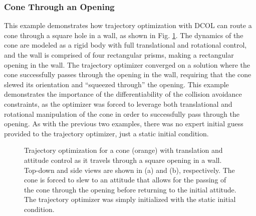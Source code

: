 \subsubsection{Cone Through an Opening}
This example demonstrates how trajectory optimization with DCOL can route a cone through a square hole in a wall, as shown in Fig. \ref{fig:conewall}. The dynamics of the cone are modeled as a rigid body with full translational and rotational control, and the wall is comprised of four rectangular prisms, making a rectangular opening in the wall. The trajectory optimizer converged on a solution where the cone successfully passes through the opening in the wall, requiring that the cone slewed its orientation and ``squeezed through'' the opening.  This example demonstrates the importance of the differentiability of the collision avoidance constraints, as the optimizer was forced to leverage both translational and rotational manipulation of the cone in order to successfully pass through the opening.  As with the previous two examples, there was no expert initial guess provided to the trajectory optimizer, just a static initial condition. 
\begin{figure}
\centering
{}
 
\caption{Trajectory optimization for a cone (orange) with translation and attitude control as it travels through a square opening in a wall. Top-down and side views are shown in (a) and (b), respectively. The cone is forced to slew to an attitude that allows for the passing of the cone through the opening before returning to the initial attitude. The trajectory optimizer was simply initialized with the static initial condition.}
\label{fig:conewall}
\end{figure}
